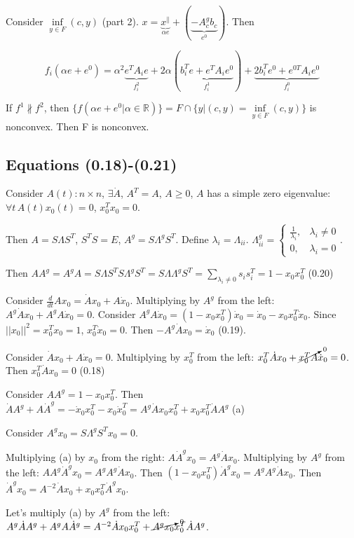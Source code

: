 \documentclass[a4paper]{article}
\begin{document}
Consider $\inf\limits_{y\in F}(c,y)$ (part 2). $x=\underbrace{x^{\parallel}}_{\alpha e}+(\underbrace{-A_c^gb_c}_{e^0})$. Then

$$f_i(\alpha e + e^0)=\alpha^2 \underbrace{e^TA_ie}_{f^2_i}+2\alpha(\underbrace{b_i^Te+e^TA_ie^0}_{f^1_i})+\underbrace{2b_i^Te^0+e^{0T}A_ie^0}_{f^0_i}$$

If $f^1\nparallel f^2$, then $\{f(\alpha e+e^0\big| \alpha\in\mathbb{R})\}=F\cap \{y\big| (c,y)=\inf\limits_{y\in F} (c,y)\}$ is nonconvex. Then F is nonconvex.
\subsection{Equations (0.18)-(0.21)}
Consider $A(t)\colon n\times n$, $\exists \dot{A}$, $A^T=A$, $A\geqslant 0$, $A$ has a simple zero eigenvalue: $\forall t\,A(t)x_0(t)=0$, $x_0^Tx_0=0$.

Then $A=S\Lambda S^T$, $S^TS=E$, $A^g=S\Lambda^gS^T$. Define $\lambda_i=\Lambda_{ii}$. $\Lambda^g_{ii}=\begin{cases}
\frac{1}{\lambda_i},& \lambda_i\neq 0\\
0, &\lambda_i=0
\end{cases}$.

Then $AA^g=A^gA=S\Lambda S^TS\Lambda^gS^T=S\Lambda\Lambda^gS^T=\sum\limits_{\lambda_i\neq 0} s_is_i^T=1-x_0x_0^T$ (0.20)

Consider $\frac{d}{dt}Ax_0=\dot{A}x_0+A\dot{x}_0$. Multiplying by $A^g$ from the left: $A^g\dot{A}x_0+A^gA\dot{x}_0=0$.
Consider $A^gA\dot{x}_0=(1-x_0x_0^T)\dot{x}_0=\dot{x}_0-x_0x_0^T\dot{x}_0$. Since $||x_0||^2=x_0^Tx_0=1$, $x_0^T\dot{x}_0=0$. Then $-A^g\dot{A}x_0=\dot{x}_0$ (0.19).

Consider $\dot{A}x_0+A\dot{x}_0=0$. Multiplying by $x_0^T$ from the left: $x_0^T\dot{A}x_0+\cancelto{0}{x_0^TA}\dot{x}_0=0$. Then $x_0^T\dot{A}x_0=0$ (0.18)

Consider $AA^g=1-x_0x_0^T$. Then $\dot{A}A^g+A\dot{A}^g=-\dot{x}_0x_0^T-x_0\dot{x}_0^T=A^g\dot{A}x_0x_0^T+x_0x_0^T\dot{A}A^g$ (a)

Consider $A^gx_0=S\Lambda^gS^Tx_0=0$.

Multiplying (a) by $x_0$ from the right: $A\dot{A}^gx_0=A^g\dot{A}x_0$. Multiplying by $A^g$ from the left: $AA^g\dot{A}^gx_0=A^gA^g\dot{A}x_0$. Then $(1-x_0x_0^T)\dot{A}^gx_0=A^gA^g\dot{A}x_0$. Then $\dot{A}^gx_0=A^{-2}\dot{A}x_0+x_0x_0^T\dot{A}^gx_0$.

Let's multiply (a) by $A^g$ from the left: $A^g\dot{A}A^g+A^gA\dot{A}^g=A^{-2}\dot{A}x_0x_0^T+\cancelto{0}{A^gx_0}x_0^T\dot{A}A^g$.
\end{document}
